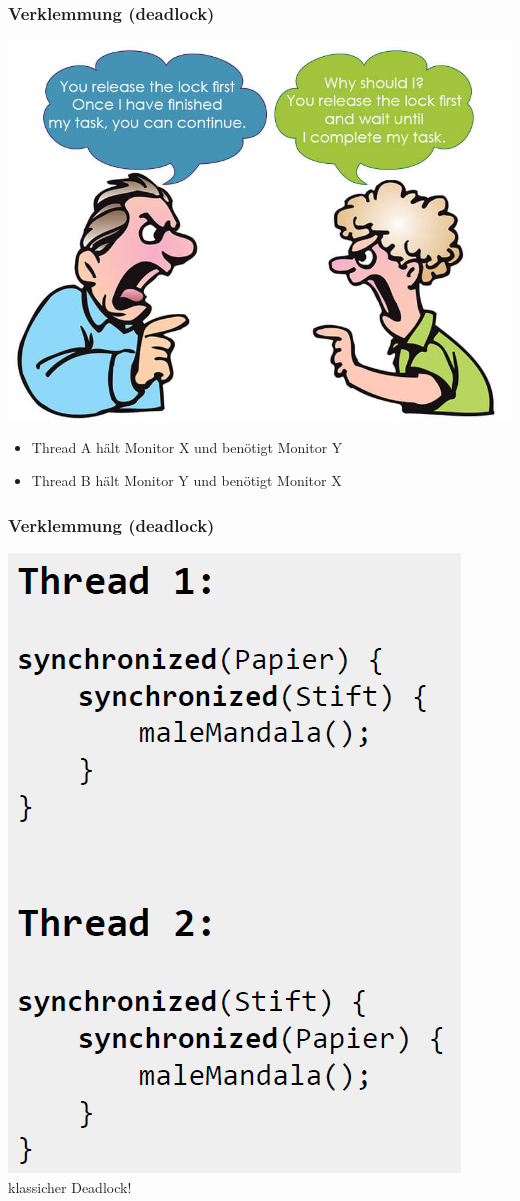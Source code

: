 \documentclass[18pt]{beamer}
\begin{document}
	\begin{frame}
		\frametitle{Verklemmung (deadlock)}
		\includegraphics[scale=0.3]{./pics/tut5/deadlock.jpg}
		\pause
		\begin{itemize}
			\item Thread A hält Monitor X und benötigt Monitor Y
			\item Thread B hält Monitor Y und benötigt Monitor X
		\end{itemize}
	\end{frame}

	\begin{frame}
		\frametitle{Verklemmung (deadlock)}
			\centering \includegraphics[scale=0.4]{./pics/tut5/deadlock-ex.png} \linebreak
			klassicher Deadlock!
	\end{frame}
\end{document}
